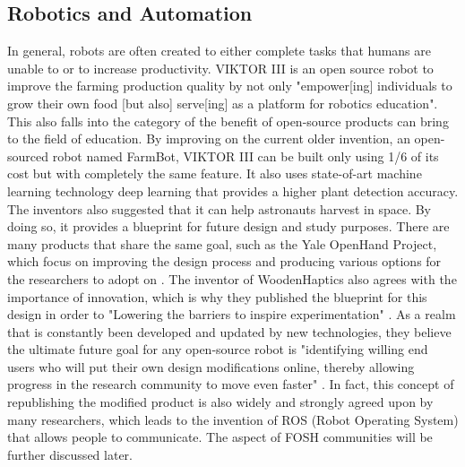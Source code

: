 \documentclass[final-report.tex]{subfiles}
\begin{document}
\subsection{Robotics and Automation}
In general, robots are often created to either complete tasks that humans are unable to or to increase productivity. 
VIKTOR III is an open source robot to improve the farming production quality by not only "empower[ing] individuals to grow their own food [but also] serve[ing] as a platform for robotics education".
This also falls into the category of the benefit of open-source products can bring to the field of education. By improving on the current older invention, an open-sourced robot named FarmBot, VIKTOR III can be built only using 1/6 of its cost but with completely the same feature. 
It also uses state-of-art machine learning technology deep learning that provides a higher plant detection accuracy. 
The inventors also suggested that it can help astronauts harvest in space. 
By doing so, it provides a blueprint for future design and study purposes. 
There are many products that share the same goal, such as the Yale OpenHand Project, which focus on improving the design process and producing various options for the researchers to adopt on \cite{ma2017yale}. 
The inventor of WoodenHaptics also agrees with the importance of innovation, which is why they published the blueprint for this design in order to "Lowering the barriers to inspire experimentation" \cite{yip2017spurring}. 
As a realm that is constantly been developed and updated by new technologies, they believe the ultimate future goal for any open-source robot is "identifying willing end users who will put their own design modifications online, thereby allowing progress in the research community to move even faster" \cite{yip2017spurring}\cite{mondada2017bringing}.
In fact, this concept of republishing the modified product is also widely and strongly agreed upon by many researchers, which leads to the invention of ROS\cite{alami2018influencers} (Robot Operating System) that allows people to communicate. 
The aspect of FOSH communities will be further discussed later. 
\end{document}
